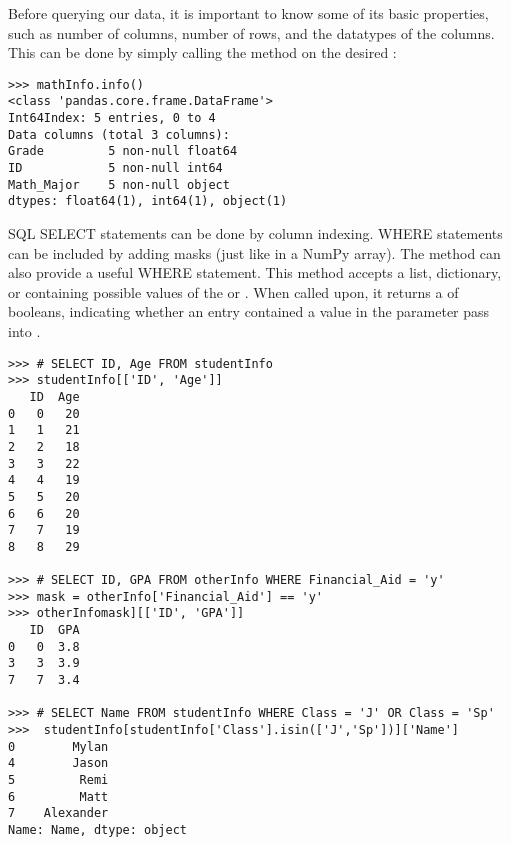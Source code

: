 Before querying our data, it is important to know some of its basic properties,
such as number of columns, number of rows, and the datatypes of the columns.
This can be done by simply calling the  method on the desired
:

\begin{lstlisting}
>>> mathInfo.info()
<class 'pandas.core.frame.DataFrame'>
Int64Index: 5 entries, 0 to 4
Data columns (total 3 columns):
Grade         5 non-null float64
ID            5 non-null int64
Math_Major    5 non-null object
dtypes: float64(1), int64(1), object(1)
\end{lstlisting}

\begin{comment}
We can also get some basic information about the structure of the \li{DataFrame}
using the \li{head()} or \li{tail()} methods.

\begin{lstlisting}
>>> mathInfo.head()
   Grade  ID Math_Major  ID  Age  GPA
0    4.0   0          y   0   20  3.8
1    3.0   1          n   2   18  3.0
2    3.5   5          y   4   19  2.8
3    3.0   6          n   6   20  3.8
4    4.0   3          n   7   19  3.4
\end{lstlisting}
\end{comment}

SQL SELECT statements can be done by column indexing.
WHERE statements can be included by adding masks (just like in a NumPy array).
The method  can also provide a useful WHERE statement.
This method accepts a list, dictionary, or  containing possible values of the  or .
When called upon, it returns a  of booleans, indicating whether an entry contained a value in the parameter pass into .


\begin{lstlisting}
>>> # SELECT ID, Age FROM studentInfo
>>> studentInfo[['ID', 'Age']]
   ID  Age
0   0   20
1   1   21
2   2   18
3   3   22
4   4   19
5   5   20
6   6   20
7   7   19
8   8   29

>>> # SELECT ID, GPA FROM otherInfo WHERE Financial_Aid = 'y'
>>> mask = otherInfo['Financial_Aid'] == 'y'
>>> otherInfomask][['ID', 'GPA']]
   ID  GPA
0   0  3.8
3   3  3.9
7   7  3.4

>>> # SELECT Name FROM studentInfo WHERE Class = 'J' OR Class = 'Sp'
>>>  studentInfo[studentInfo['Class'].isin(['J','Sp'])]['Name']
0        Mylan
4        Jason
5         Remi
6         Matt
7    Alexander
Name: Name, dtype: object
\end{lstlisting}

